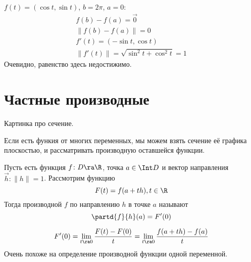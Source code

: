 \begin{exmp}
	$f(t) = (\cos t, \sin t)$, $b = 2\pi$, $a = 0$:
	\begin{gather*}
		f(b) - f(a) = \vec 0 \\
		\| f(b) - f(a) \| = 0 \\
		f'(t) = (-\sin t, \cos t) \\
		\| f'(t) \| = \sqrt{\sin^2 t + \cos^2 t} = 1
	\end{gather*}
	Очевидно, равенство здесь недостижимо.
\end{exmp}

\section{Частные производные}

Картинка про сечение.

Если есть функия от многих переменных, мы можем взять сечение её графика плоскостью, и рассматривать производную оставшейся функции.

\begin{Def}
	Пусть есть функция $f\colon D \ra \R$, точка $a \in \Int D$ и вектор направления $\vec h\colon \|h\| = 1$.
	Рассмотрим функцию
	\[ F(t) = f(a + th), t \in \R \]
	Тогда производной $f$ по направлению $h$ в точке $a$ называют
	\[ \partd{f}{h}(a) = F'(0) \]
\end{Def}

\begin{Rem}
	\[ F'(0) = \lim_{t \ra 0} \frac{F(t) - F(0)}t = \lim_{t \ra 0} \frac{f(a + th) - f(a)}t \]
	Очень похоже на определение производной функции одной переменной.
\end{Rem}

